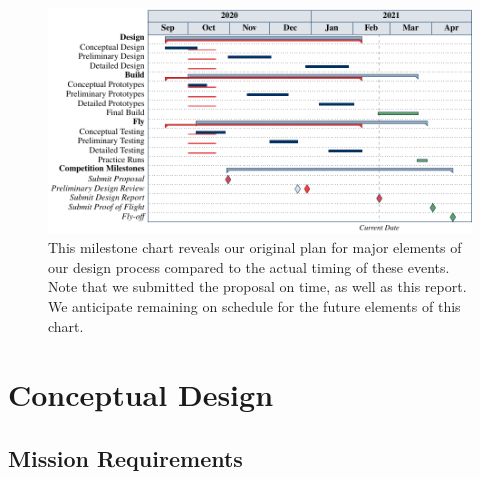 \documentclass[report]{byu-aero}
\begin{document}


\begin{figure}[h!]
	\centering
	\includegraphics[width=4.5in]{ganttchart.pdf}
	\caption{This milestone chart reveals our {\color{\BYUblue} original plan} for major elements of our design process compared to the  {\color{\BYUred} actual timing} of these events.  Note that we submitted the proposal on time, as well as this report.  We anticipate remaining on schedule for the {\color{\BYUgreen} future elements} of this chart.}
	\label{fig:plannedvsactualtiming}
\end{figure}

\section{Conceptual Design} %
\label{sec:ConceptualDesign}


\subsection{Mission Requirements}
\label{ssec:missionreqs}
\end{document}
